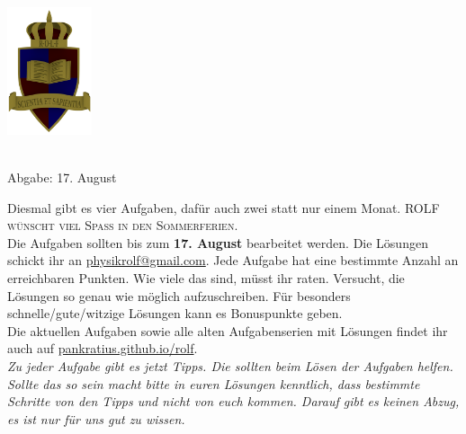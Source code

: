 \documentclass[a4paper]{article}
\begin{document}
	\vspace*{-2cm}
	\parbox{4cm}{\includegraphics[width=2.5cm]{../images/ROLF4.png}}
	\parbox{10.6cm}{ \\
				 Abgabe: 17. August \\ \vspace*{-.5cm} }
	
	

\thispagestyle{empty}
\begin{framed}
	\noindent
	\scriptsize
	Diesmal gibt es vier Aufgaben, dafür auch zwei statt nur einem Monat. \textsc{ROLF wünscht viel Spaß in den Sommerferien.}\\
	Die Aufgaben sollten bis zum \textbf{17. August} bearbeitet werden. Die Lösungen schickt ihr an \href{mailto:physikrolf@gmail.com}{physikrolf@gmail.com}.
	Jede Aufgabe hat eine bestimmte Anzahl an erreichbaren Punkten. Wie viele das sind, müsst ihr raten. Versucht, die Lösungen so genau wie möglich aufzuschreiben. Für besonders schnelle/gute/witzige Lösungen kann es Bonuspunkte geben.\\ Die aktuellen Aufgaben sowie alle alten Aufgabenserien mit Lösungen findet ihr auch auf \url{pankratius.github.io/rolf}.\\ \textit{Zu jeder Aufgabe gibt es jetzt Tipps. Die sollten beim Lösen der Aufgaben helfen.\\ Sollte das so sein macht bitte in euren Lösungen kenntlich, dass bestimmte Schritte von den Tipps und nicht von euch kommen. Darauf gibt es keinen Abzug, es ist nur für uns gut zu wissen.}
\end{framed}

\noindent
\end{document}

